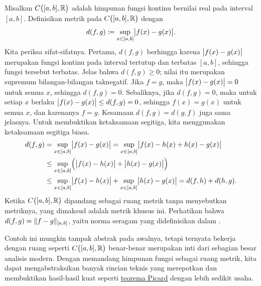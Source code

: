 \begin{example} \label{example:msC01}
Misalkan $C\bigl([a,b],{\mathbb{R}}\bigr)$ adalah himpunan
fungsi kontinu bernilai real pada interval $[a,b]$.
Definisikan metrik pada $C\bigl([a,b],{\mathbb{R}}\bigr)$ dengan
\begin{equation*}
d(f,g) \coloneqq \sup_{x \in [a,b]} \bigl\lvert {f(x)-g(x)} \bigr\rvert .
\end{equation*}
Kita periksa sifat-sifatnya.  Pertama, $d(f,g)$ berhingga karena
$\bigl\lvert {f(x)-g(x)} \bigr\rvert$ merupakan fungsi kontinu pada interval tertutup dan terbatas
$[a,b]$, sehingga fungsi tersebut terbatas.
Jelas bahwa $d(f,g) \geq 0$;
nilai itu merupakan supremum bilangan-bilangan taknegatif.  Jika $f = g$,
maka $\bigl\lvert {f(x)-g(x)} \bigr\rvert = 0$ untuk semua $x$, sehingga $d(f,g) = 0$.  Sebaliknya,
jika $d(f,g) = 0$, maka untuk setiap $x$ berlaku $\bigl\lvert {f(x)-g(x)} \bigr\rvert \leq d(f,g) = 0$,
sehingga $f(x) = g(x)$ untuk semua $x$, dan karenanya $f=g$.  Kesamaan
$d(f,g) = d(g,f)$ juga sama jelasnya.  Untuk membuktikan ketaksamaan segitiga,
kita menggunakan ketaksamaan segitiga biasa.
\begin{equation*}
\begin{split}
d(f,g) & =
\sup_{x \in [a,b]} \bigl\lvert {f(x)-g(x)} \bigr\rvert =
\sup_{x \in [a,b]} \bigl\lvert {f(x)-h(x)+h(x)-g(x)} \bigr\rvert
\\
& \leq
\sup_{x \in [a,b]} \Bigl( \bigl\lvert {f(x)-h(x)} \bigr\rvert+\bigl\lvert {h(x)-g(x)} \bigr\rvert \Bigr)
\\
& \leq
\sup_{x \in [a,b]} \bigl\lvert {f(x)-h(x)} \bigr\rvert+
\sup_{x \in [a,b]} \bigl\lvert {h(x)-g(x)} \bigr\rvert = d(f,h) + d(h,g) .
\end{split}
\end{equation*}
Ketika $C\bigl([a,b],{\mathbb{R}}\bigr)$ dipandang sebagai ruang metrik tanpa menyebutkan metriknya,
yang dimaksud adalah metrik khusus ini.
Perhatikan bahwa $d(f,g) = \lVert {f-g} \rVert_{[a,b]}$, yaitu norma seragam yang didefinisikan dalam .

Contoh ini mungkin tampak abstrak pada awalnya, tetapi ternyata bekerja dengan
ruang seperti $C\bigl([a,b],{\mathbb{R}}\bigr)$ benar-benar merupakan inti dari sebagian besar
analisis modern.  Dengan memandang himpunan fungsi sebagai ruang metrik, kita dapat
mengabstraksikan banyak rincian teknis yang merepotkan dan membuktikan hasil-hasil kuat seperti
\hyperref[thm:fs:picard]{teorema Picard} dengan lebih sedikit usaha.
\end{example}

